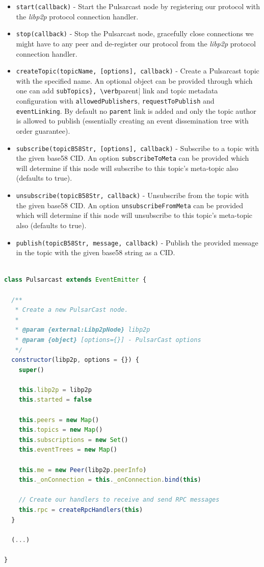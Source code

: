 \begin{itemize}
  \item
    \verb|start(callback)| - Start the Pulsarcast node by registering our protocol with the \emph{libp2p} protocol connection handler.
  \item
    \verb|stop(callback)| - Stop the Pulsarcast node, gracefully close connections we might have to any peer and de-register our protocol from the \emph{libp2p} protocol connection handler.
  \item
  \verb|createTopic(topicName, [options], callback)| - Create a Pulsarcast topic with the specified name. An optional object can be provided through which one can add \verb|subTopics}, \verb|parent| link and topic metadata configuration with \verb|allowedPublishers|, \verb|requestToPublish| and \verb|eventLinking|. By default no \verb|parent| link is added and only the topic author is allowed to publish (essentially creating an event dissemination tree with order guarantee).
  \item
    \verb|subscribe(topicB58Str, [options], callback)| - Subscribe to a topic with the given base58 CID. An option \verb|subscribeToMeta| can be provided which will determine if this node will subscribe to this topic's meta-topic also (defaults to true).
  \item
    \verb|unsubscribe(topicB58Str, callback)| - Unsubscribe from the topic with the given base58 CID. An option \verb|unsubscribeFromMeta| can be provided which will determine if this node will unsubscribe to this topic's meta-topic also (defaults to true).
  \item
    \verb|publish(topicB58Str, message, callback)| - Publish the provided message in the topic with the given base58 string as a CID.
\end{itemize}

\begin{lstlisting}[language=JavaScript, float, caption={Pulsarcast constructor},label={pulsarcast-constructor}]

class Pulsarcast extends EventEmitter {

  /**
   * Create a new PulsarCast node.
   *
   * @param {external:Libp2pNode} libp2p
   * @param {object} [options={}] - PulsarCast options
   */
  constructor(libp2p, options = {}) {
    super()

    this.libp2p = libp2p
    this.started = false

    this.peers = new Map()
    this.topics = new Map()
    this.subscriptions = new Set()
    this.eventTrees = new Map()

    this.me = new Peer(libp2p.peerInfo)
    this._onConnection = this._onConnection.bind(this)

    // Create our handlers to receive and send RPC messages
    this.rpc = createRpcHandlers(this)
  }

  (...)

}
\end{lstlisting}

